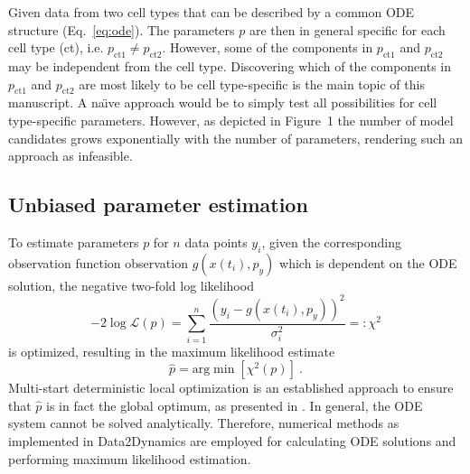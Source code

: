 \documentclass{bioinfo}
\begin{document}
Given data from two cell types that can be described by a common ODE structure (Eq.~\ref{eq:ode}).
The parameters $p$ are then in general specific for each cell type (ct), i.e. $p_\text{ct1} \neq p_\text{ct2}$.
However, some of the components in $p_\text{ct1}$ and $p_\text{ct2}$ may be independent from the cell type.
Discovering which of the components in $p_\text{ct1}$ and $p_\text{ct2}$ are most likely to be cell type-specific is the main topic of this manuscript.
A na\"{\i}ve approach would be to simply test all possibilities for cell type-specific parameters.
However, as depicted in Figure~1\vphantom{\ref{fig:01}} the number of model candidates grows exponentially with the number of parameters, rendering such an approach as infeasible.

\subsection{Unbiased parameter estimation}

To estimate parameters $p$ for $n$ data points ${y_i}$, given the corresponding observation function observation $g(x(t_i),p_y)$ which is dependent on the ODE solution, the negative two-fold log likelihood
\begin{equation}
-2\log \mathcal L(p) = \sum_{i=1}^n \frac{(y_i-g(x(t_i),p_y))^2}{\sigma_i^2} =: \chi^2\label{eq:lik}
\end{equation}
is optimized, resulting in the maximum likelihood estimate
\begin{equation}
\hat p = \text{arg}\min \left[ \chi^2(p) \right] \:.
\end{equation}
Multi-start deterministic local optimization is an established approach to ensure that $\hat p$ is in fact the global optimum, as presented in \citep{Raue2013}.
In general, the ODE system cannot be solved analytically.
Therefore, numerical methods as implemented in Data2Dynamics \citep{Raue2015} are employed for calculating ODE solutions and performing maximum likelihood estimation.
\end{document}
